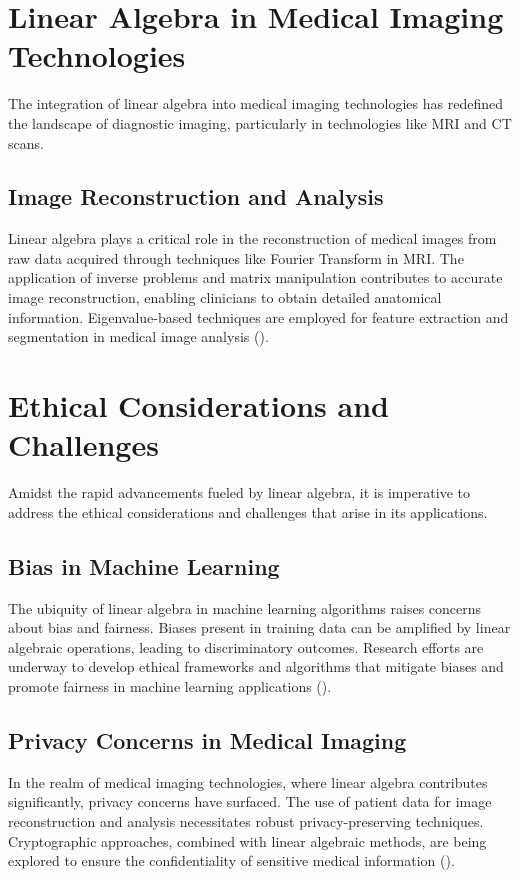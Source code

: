\section{Linear Algebra in Medical Imaging Technologies}
The integration of linear algebra into medical imaging technologies has redefined the landscape of diagnostic imaging, particularly in technologies like MRI and CT scans.

\subsection{Image Reconstruction and Analysis}
Linear algebra plays a critical role in the reconstruction of medical images from raw data acquired through techniques like Fourier Transform in MRI. The application of inverse problems and matrix manipulation contributes to accurate image reconstruction, enabling clinicians to obtain detailed anatomical information. Eigenvalue-based techniques are employed for feature extraction and segmentation in medical image analysis (\cite{chen_smith_2017}).

\newpage
\thispagestyle{plain}

\section{Ethical Considerations and Challenges}
Amidst the rapid advancements fueled by linear algebra, it is imperative to address the ethical considerations and challenges that arise in its applications.

\subsection{Bias in Machine Learning}
The ubiquity of linear algebra in machine learning algorithms raises concerns about bias and fairness. Biases present in training data can be amplified by linear algebraic operations, leading to discriminatory outcomes. Research efforts are underway to develop ethical frameworks and algorithms that mitigate biases and promote fairness in machine learning applications (\cite{diakopoulos_2016}).

\subsection{Privacy Concerns in Medical Imaging}
In the realm of medical imaging technologies, where linear algebra contributes significantly, privacy concerns have surfaced. The use of patient data for image reconstruction and analysis necessitates robust privacy-preserving techniques. Cryptographic approaches, combined with linear algebraic methods, are being explored to ensure the confidentiality of sensitive medical information (\cite{ma_lou_ren_2015}).

